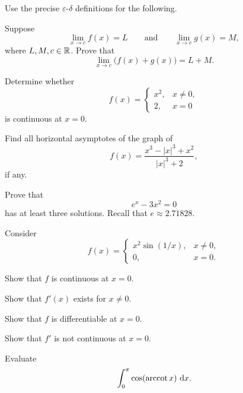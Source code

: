 \begin{problem}
Use the precise $\varepsilon$-$\delta$ definitions for the following.
\begin{problemsubparts}
\item Suppose
\[
\lim_{x\to c}f(x)=L
\qquad\text{and}\qquad
\lim_{x\to c}g(x)=M,
\]
where $L, M, c\in\mathbb{R}$. Prove that
\[
\lim_{x\to c}\bigl(f(x)+g(x)\bigr)=L+M.
\]
\item Determine whether
\[
f(x)=
\begin{cases}
x^2, & x\ne0, \\
2, & x=0
\end{cases}
\]
is continuous at $x=0$.
\end{problemsubparts}
\end{problem}

\begin{problem}
\begin{problemsubparts}
\item Find all horizontal asymptotes of the graph of
\[
f(x)=\frac{x^3-|x|^3+x^2}{|x|^3+2},
\]
if any.
\item Prove that
\[
e^x-3x^2=0
\]
has at least three solutions. Recall that $e\approx2.71828$.
\end{problemsubparts}
\end{problem}

\begin{problem}
Consider
\[
f(x)=
\begin{cases}
x^2\sin(1/x), & x\ne0, \\
0, & x=0.
\end{cases}
\]
\begin{problemsubparts}
\item Show that $f$ is continuous at $x=0$.
\item Show that $f'(x)$ exists for $x\ne0$.
\item Show that $f$ is differentiable at $x=0$.
\item Show that $f'$ is not continuous at $x=0$.
\end{problemsubparts}
\end{problem}

\begin{problem}
Evaluate
\[
\int_0^\pi \cos(\operatorname{arccot} x)\,\mathop{}\!\mathrm{d} x.
\]
\end{problem}

